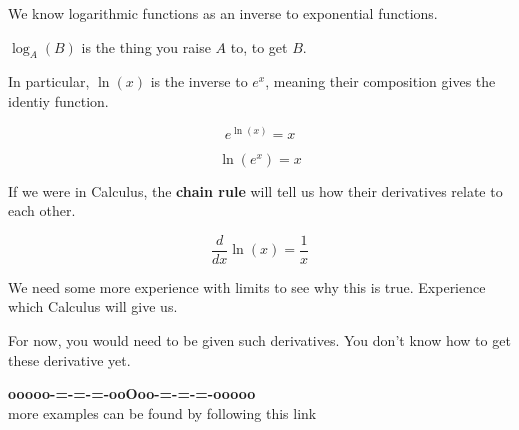 \documentclass{ximera}
\begin{document}
\begin{idea}


We know logarithmic functions as an inverse to exponential functions. 



\begin{center}


$\log_A(B)$ is the thing you raise $A$ to, to get $B$. 


\end{center}

In particular, $\ln(x)$ is the inverse to $e^x$, meaning their composition gives the identiy function.



\[
e^{\ln(x)} = x
\]


\[
\ln\left( e^x \right) = x
\]

If we were in Calculus, the \textbf{chain rule} will tell us how their derivatives relate to each other.




\[
\frac{d}{dx} \ln(x) = \frac{1}{x}
\]



\end{idea}


We need some more experience with limits to see why this is true. Experience which Calculus will give us. 


For now, you would need to be given such derivatives.  You don't know how to get these derivative yet.











\begin{center}
\textbf{\textcolor{green!50!black}{ooooo-=-=-=-ooOoo-=-=-=-ooooo}} \\

more examples can be found by following this link\\ 

\end{center}
\end{document}
